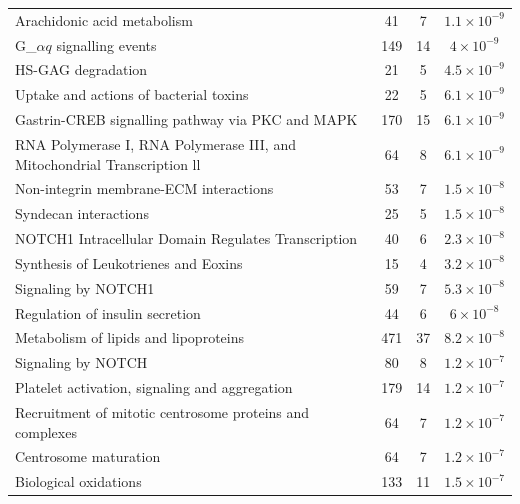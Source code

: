 \begin{table}[!hp]
{\begin{tabular}{lccc}
  \rowcolor{Cluster_Red!20} 
  Arachidonic acid metabolism &  41 &   7 & $1.1 \times 10^{-9}$ \\ 
  \rowcolor{Cluster_Red!15} 
  G_${\alpha q}$ signalling events & 149 &  14 & $4 \times 10^{-9}$ \\ 
  \rowcolor{Cluster_Red!20} 
  HS-GAG degradation &  21 &   5 & $4.5 \times 10^{-9}$ \\ 
  \rowcolor{Cluster_Red!15} 
  Uptake and actions of bacterial toxins &  22 &   5 & $6.1 \times 10^{-9}$ \\ 
  \rowcolor{Cluster_Red!20} 
  Gastrin-CREB signalling pathway via PKC and MAPK & 170 &  15 & $6.1 \times 10^{-9}$ \\ 
  \rowcolor{Cluster_Red!15} 
  RNA Polymerase I, RNA Polymerase III, and Mitochondrial Transcription \textcolor{Cluster_Red!15}{ll}  &  64 &   8 & $6.1 \times 10^{-9}$ \\ 
  \rowcolor{Cluster_Red!20} 
  Non-integrin membrane-ECM interactions &  53 &   7 & $1.5 \times 10^{-8}$ \\ 
  \rowcolor{Cluster_Red!15} 
  Syndecan interactions &  25 &   5 & $1.5 \times 10^{-8}$ \\ 
  \rowcolor{Cluster_Red!20} 
  NOTCH1 Intracellular Domain Regulates Transcription &  40 &   6 & $2.3 \times 10^{-8}$ \\ 
  \rowcolor{Cluster_Red!15} 
  Synthesis of Leukotrienes and Eoxins &  15 &   4 & $3.2 \times 10^{-8}$ \\ 
  \rowcolor{Cluster_Red!20} 
  Signaling by NOTCH1 &  59 &   7 & $5.3 \times 10^{-8}$ \\ 
  \rowcolor{Cluster_Red!15} 
  Regulation of insulin secretion &  44 &   6 & $6 \times 10^{-8}$ \\ 
  \rowcolor{Cluster_Red!20} 
  Metabolism of lipids and lipoproteins & 471 &  37 & $8.2 \times 10^{-8}$ \\ 
  \rowcolor{Cluster_Red!15} 
  Signaling by NOTCH &  80 &   8 & $1.2 \times 10^{-7}$ \\ 
  \rowcolor{Cluster_Red!20} 
  Platelet activation, signaling and aggregation & 179 &  14 & $1.2 \times 10^{-7}$ \\ 
  \rowcolor{Cluster_Red!15} 
  Recruitment of mitotic centrosome proteins and complexes &  64 &   7 & $1.2 \times 10^{-7}$ \\ 
  \rowcolor{Cluster_Red!20} 
  Centrosome maturation &  64 &   7 & $1.2 \times 10^{-7}$ \\ 
  \rowcolor{Cluster_Red!15} 
  Biological oxidations & 133 &  11 & $1.5 \times 10^{-7}$ \\ 
  \hline
\end{tabular}
}
\end{table}

